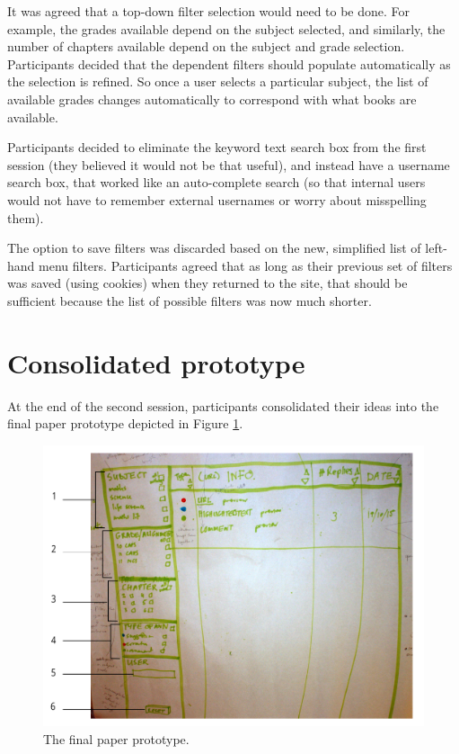 It was agreed that a top-down filter selection would need to be done. For example, the grades available depend on the subject selected, and similarly, the number of chapters available depend on the subject and grade selection. Participants decided that the dependent filters should populate automatically as the selection is refined. So once a user selects a particular subject, the list of available grades changes automatically to correspond with what books are available. 

Participants decided to eliminate the keyword text search box from the first session (they believed it would not be that useful), and instead have a username search box, that worked like an auto-complete search (so that internal users would not have to remember external usernames or worry about misspelling them). 

The option to save filters was discarded based on the new, simplified list of left-hand menu filters. Participants agreed that as long as their previous set of filters was saved (using cookies) when they returned to the site, that should be sufficient because the list of possible filters was now much shorter. 

\section{Consolidated prototype}
At the end of the second session, participants consolidated their ideas into the final paper prototype depicted in Figure \ref{fig:FinalPP}.
\begin{figure}[h!]
    \centering
    \includegraphics[width=\textwidth]{Figures/PDFinalLabels.png}
 \caption{The final paper prototype.}
 \label{fig:FinalPP}
\end{figure}

